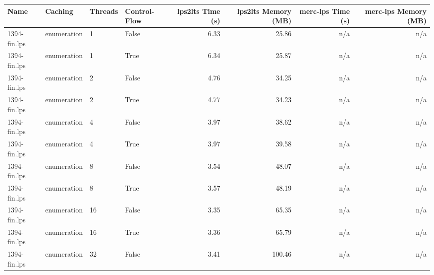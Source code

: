 \newcommand{\timeout}{---}
\newcommand{\oom}{OOM}
\newcommand{\error}{$\times$}
\newcommand{\na}{n/a}

\begin{tabular}{l l l l r r r r}
  Name                              & Caching     & Threads & Control-Flow & lps2lts Time (s) & lps2lts Memory (MB) & merc-lps Time (s) & merc-lps Memory (MB) \\
  \hline
  1394-fin.lps                      & enumeration & 1       & False        &             6.33 &               25.86 &               \na &                  \na \\
  1394-fin.lps                      & enumeration & 1       & True         &             6.34 &               25.87 &               \na &                  \na \\
  1394-fin.lps                      & enumeration & 2       & False        &             4.76 &               34.25 &               \na &                  \na \\
  1394-fin.lps                      & enumeration & 2       & True         &             4.77 &               34.23 &               \na &                  \na \\
  1394-fin.lps                      & enumeration & 4       & False        &             3.97 &               38.62 &               \na &                  \na \\
  1394-fin.lps                      & enumeration & 4       & True         &             3.97 &               39.58 &               \na &                  \na \\
  1394-fin.lps                      & enumeration & 8       & False        &             3.54 &               48.07 &               \na &                  \na \\
  1394-fin.lps                      & enumeration & 8       & True         &             3.57 &               48.19 &               \na &                  \na \\
  1394-fin.lps                      & enumeration & 16      & False        &             3.35 &               65.35 &               \na &                  \na \\
  1394-fin.lps                      & enumeration & 16      & True         &             3.36 &               65.79 &               \na &                  \na \\
  1394-fin.lps                      & enumeration & 32      & False        &             3.41 &              100.46 &               \na &                  \na \\

\end{tabular}
